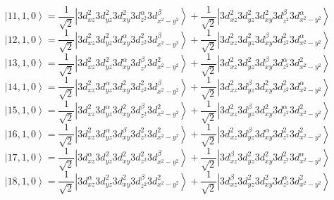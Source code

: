 \documentclass[11pt]{article}
\begin{document}
\begin{equation*}
\left|11,1,0\right>=\frac{1}{\sqrt{2}}\left|3d_{xz}^{2}3d_{yz}^{2}3d_{xy}^{2}3d_{z^2}^{\alpha}3d_{x^2-y^2}^{\beta}\right>+\frac{1}{\sqrt{2}}\left|3d_{xz}^{2}3d_{yz}^{2}3d_{xy}^{2}3d_{z^2}^{\beta}3d_{x^2-y^2}^{\alpha}\right>\end{equation*}
\begin{equation*}
\left|12,1,0\right>=\frac{1}{\sqrt{2}}\left|3d_{xz}^{2}3d_{yz}^{2}3d_{xy}^{\alpha}3d_{z^2}^{2}3d_{x^2-y^2}^{\beta}\right>+\frac{1}{\sqrt{2}}\left|3d_{xz}^{2}3d_{yz}^{2}3d_{xy}^{\beta}3d_{z^2}^{2}3d_{x^2-y^2}^{\alpha}\right>\end{equation*}
\begin{equation*}
\left|13,1,0\right>=\frac{1}{\sqrt{2}}\left|3d_{xz}^{2}3d_{yz}^{2}3d_{xy}^{\alpha}3d_{z^2}^{\beta}3d_{x^2-y^2}^{2}\right>+\frac{1}{\sqrt{2}}\left|3d_{xz}^{2}3d_{yz}^{2}3d_{xy}^{\beta}3d_{z^2}^{\alpha}3d_{x^2-y^2}^{2}\right>\end{equation*}
\begin{equation*}
\left|14,1,0\right>=\frac{1}{\sqrt{2}}\left|3d_{xz}^{2}3d_{yz}^{\alpha}3d_{xy}^{2}3d_{z^2}^{2}3d_{x^2-y^2}^{\beta}\right>+\frac{1}{\sqrt{2}}\left|3d_{xz}^{2}3d_{yz}^{\beta}3d_{xy}^{2}3d_{z^2}^{2}3d_{x^2-y^2}^{\alpha}\right>\end{equation*}
\begin{equation*}
\left|15,1,0\right>=\frac{1}{\sqrt{2}}\left|3d_{xz}^{2}3d_{yz}^{\alpha}3d_{xy}^{2}3d_{z^2}^{\beta}3d_{x^2-y^2}^{2}\right>+\frac{1}{\sqrt{2}}\left|3d_{xz}^{2}3d_{yz}^{\beta}3d_{xy}^{2}3d_{z^2}^{\alpha}3d_{x^2-y^2}^{2}\right>\end{equation*}
\begin{equation*}
\left|16,1,0\right>=\frac{1}{\sqrt{2}}\left|3d_{xz}^{2}3d_{yz}^{\alpha}3d_{xy}^{\beta}3d_{z^2}^{2}3d_{x^2-y^2}^{2}\right>+\frac{1}{\sqrt{2}}\left|3d_{xz}^{2}3d_{yz}^{\beta}3d_{xy}^{\alpha}3d_{z^2}^{2}3d_{x^2-y^2}^{2}\right>\end{equation*}
\begin{equation*}
\left|17,1,0\right>=\frac{1}{\sqrt{2}}\left|3d_{xz}^{\alpha}3d_{yz}^{2}3d_{xy}^{2}3d_{z^2}^{2}3d_{x^2-y^2}^{\beta}\right>+\frac{1}{\sqrt{2}}\left|3d_{xz}^{\beta}3d_{yz}^{2}3d_{xy}^{2}3d_{z^2}^{2}3d_{x^2-y^2}^{\alpha}\right>\end{equation*}
\begin{equation*}
\left|18,1,0\right>=\frac{1}{\sqrt{2}}\left|3d_{xz}^{\alpha}3d_{yz}^{2}3d_{xy}^{2}3d_{z^2}^{\beta}3d_{x^2-y^2}^{2}\right>+\frac{1}{\sqrt{2}}\left|3d_{xz}^{\beta}3d_{yz}^{2}3d_{xy}^{2}3d_{z^2}^{\alpha}3d_{x^2-y^2}^{2}\right>\end{equation*}
\end{document}
